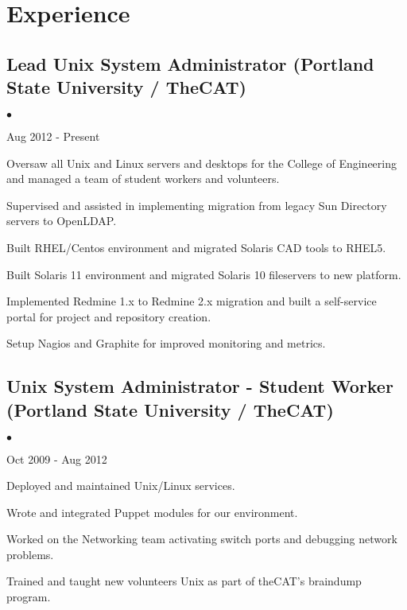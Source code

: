 \documentclass[10pt,letterpaper]{article}
\renewenvironment{itemize}{
  \begin{list}{}{
    \setlength{\leftmargin}{1.5em}
    \setlength{\itemsep}{0.25em}
    \setlength{\parskip}{0pt}
    \setlength{\parsep}{0.25em}
  }
}{
  \end{list}
}
\begin{document}
\renewenvironment{itemize}{
  \begin{list}{$\bullet$}{
    \setlength{\leftmargin}{1.5em}
    \setlength{\itemsep}{0.25em}
    \setlength{\parskip}{0pt}
    \setlength{\parsep}{0.25em}
  }
}{
  \end{list}
}
\section*{Experience}

\subsection*{Lead Unix System Administrator (Portland State University / TheCAT)}

\begin{itemize}
    \item Aug 2012 - Present
    \item Oversaw all Unix and Linux servers and desktops for the College of Engineering and managed a team of student workers and volunteers.
    \item Supervised and assisted in implementing migration from legacy Sun Directory servers to OpenLDAP.
    \item Built RHEL/Centos environment and migrated Solaris CAD tools to RHEL5.
    \item Built Solaris 11 environment and migrated Solaris 10 fileservers to new platform.
    \item Implemented Redmine 1.x to Redmine 2.x migration and built a self-service portal for project and repository creation.
    \item Setup Nagios and Graphite for improved monitoring and metrics.
\end{itemize}

\subsection*{Unix System Administrator - Student Worker (Portland State University / TheCAT)}
\begin{itemize}

    \item Oct 2009 - Aug 2012
    \item Deployed and maintained Unix/Linux services.
    \item Wrote and integrated Puppet modules for our environment.
    \item Worked on the Networking team activating switch ports and debugging network problems.
    \item Trained and taught new volunteers Unix as part of theCAT's braindump program.


\end{itemize}
\end{document}
